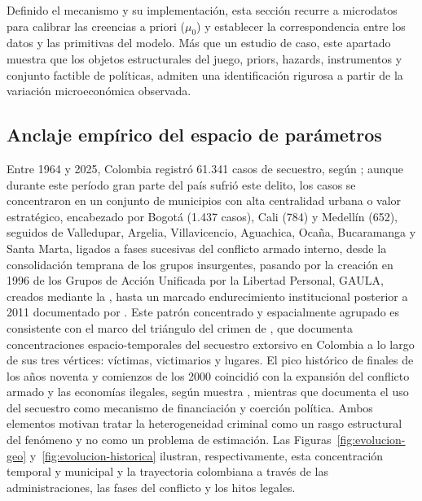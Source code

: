 \documentclass[review,authoryear,12pt]{elsarticle}
\theoremstyle{plain}
\theoremstyle{definition}
\newcommand{\1}{\mathbf{1}}
\begin{document}
Definido el mecanismo y su implementación, esta sección recurre a microdatos para calibrar las creencias a priori ($\mu_0$) y establecer la correspondencia entre los datos y las primitivas del modelo. Más que un estudio de caso, este apartado muestra que los objetos estructurales del juego, priors, hazards, instrumentos y conjunto factible de políticas, admiten una identificación rigurosa a partir de la variación microeconómica observada.

\subsection{Anclaje empírico del espacio de parámetros}\label{sec:institutional}

Entre 1964 y 2025, Colombia registró 61.341 casos de secuestro, según \citet{cnmh_datos}; aunque durante este período gran parte del país sufrió este delito, los casos se concentraron en un conjunto de municipios con alta centralidad urbana o valor estratégico, encabezado por Bogotá (1.437 casos), Cali (784) y Medellín (652), seguidos de Valledupar, Argelia, Villavicencio, Aguachica, Ocaña, Bucaramanga y Santa Marta, ligados a fases sucesivas del conflicto armado interno, desde la consolidación temprana de los grupos insurgentes, pasando por la creación en 1996 de los Grupos de Acción Unificada por la Libertad Personal, GAULA, creados mediante la \citet{ley282_1996}, hasta un marcado endurecimiento institucional posterior a 2011 documentado por \citet{CNMH2013}. Este patrón concentrado y espacialmente agrupado es consistente con el marco del triángulo del crimen de \citet{Pires2014}, que documenta concentraciones espacio-temporales del secuestro extorsivo en Colombia a lo largo de sus tres vértices: víctimas, victimarios y lugares. El pico histórico de finales de los años noventa y comienzos de los 2000 coincidió con la expansión del conflicto armado y las economías ilegales, según muestra \citet{pinto2004}, mientras que \citet{Zarate2007} documenta el uso del secuestro como mecanismo de financiación y coerción política. Ambos elementos motivan tratar la heterogeneidad criminal como un rasgo estructural del fenómeno y no como un problema de estimación. Las Figuras~\ref{fig:evolucion-geo} y~\ref{fig:evolucion-historica} ilustran, respectivamente, esta concentración temporal y municipal y la trayectoria colombiana a través de las administraciones, las fases del conflicto y los hitos legales.
\end{document}

